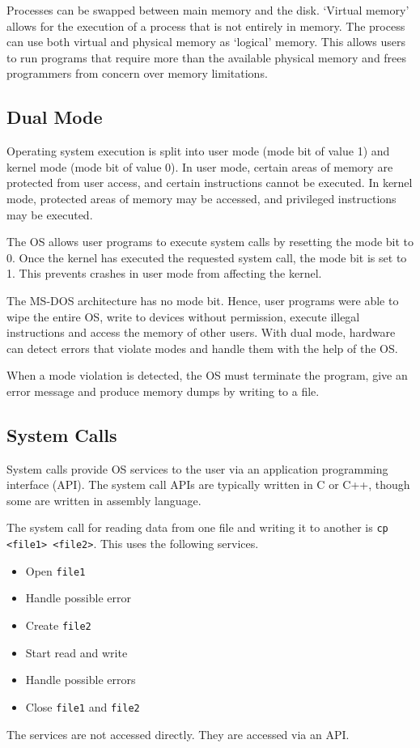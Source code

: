 Processes can be swapped between main memory and the disk.
`Virtual memory' allows for the execution of a process that is not entirely in memory.
The process can use both virtual and physical memory as `logical' memory.
This allows users to run programs that require more than the available physical memory and frees programmers from concern over memory limitations.

\subsection{Dual Mode}

Operating system execution is split into user mode (mode bit of value \num{1}) and kernel mode (mode bit of value \num{0}).
In user mode, certain areas of memory are protected from user access, and certain instructions cannot be executed.
In kernel mode, protected areas of memory may be accessed, and privileged instructions may be executed.

The OS allows user programs to execute system calls by resetting the mode bit to \num{0}.
Once the kernel has executed the requested system call, the mode bit is set to \num{1}.
This prevents crashes in user mode from affecting the kernel.

The MS-DOS architecture has no mode bit.
Hence, user programs were able to wipe the entire OS, write to devices without permission, execute illegal instructions and access the memory of other users.
With dual mode, hardware can detect errors that violate modes and handle them with the help of the OS.

When a mode violation is detected, the OS must terminate the program, give an error message and produce memory dumps by writing to a file.

\subsection{System Calls}

System calls provide OS services to the user via an application programming interface (API).
The system call APIs are typically written in C or C++, though some are written in assembly language.

The system call for reading data from one file and writing it to another is \texttt{cp <file1> <file2>}.
This uses the following services.
\begin{itemize}
  \item Open \texttt{file1}
  \item Handle possible error
  \item Create \texttt{file2}
  \item Start read and write
  \item Handle possible errors
  \item Close \texttt{file1} and \texttt{file2}
\end{itemize}
The services are not accessed directly.
They are accessed via an API.

